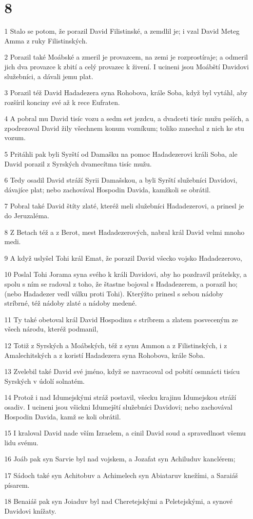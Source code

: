 \chapter{8}

\par 1 Stalo se potom, že porazil David Filistinské, a zemdlil je; i vzal David Meteg Amma z ruky Filistinských.
\par 2 Porazil také Moábské a zmeril je provazcem, na zemi je rozprostíraje; a odmeril jich dva provazce k zbití a celý provazec k živení. I ucineni jsou Moábští Davidovi služebníci, a dávali jemu plat.
\par 3 Porazil též David Hadadezera syna Rohobova, krále Soba, když byl vytáhl, aby rozšíril konciny své až k rece Eufraten.
\par 4 A pobral mu David tisíc vozu a sedm set jezdcu, a dvadceti tisíc mužu peších, a zpodrezoval David žily všechnem konum vozníkum; toliko zanechal z nich ke stu vozum.
\par 5 Pritáhli pak byli Syrští od Damašku na pomoc Hadadezerovi králi Soba, ale David porazil z Syrských dvamecítma tisíc mužu.
\par 6 Tedy osadil David stráží Syrii Damašskou, a byli Syrští služebníci Davidovi, dávajíce plat; nebo zachovával Hospodin Davida, kamžkoli se obrátil.
\par 7 Pobral také David štíty zlaté, kteréž meli služebníci Hadadezerovi, a prinesl je do Jeruzaléma.
\par 8 Z Betach též a z Berot, mest Hadadezerových, nabral král David velmi mnoho medi.
\par 9 A když uslyšel Tohi král Emat, že porazil David všecko vojsko Hadadezerovo,
\par 10 Poslal Tohi Jorama syna svého k králi Davidovi, aby ho pozdravil prátelsky, a spolu s ním se radoval z toho, že štastne bojoval s Hadadezerem, a porazil ho; (nebo Hadadezer vedl válku proti Tohi). Kterýžto prinesl s sebou nádoby stríbrné, též nádoby zlaté a nádoby medené.
\par 11 Ty také obetoval král David Hospodinu s stríbrem a zlatem posveceným ze všech národu, kteréž podmanil,
\par 12 Totiž z Syrských a Moábských, též z synu Ammon a z Filistinských, i z Amalechitských a z koristí Hadadezera syna Rohobova, krále Soba.
\par 13 Zvelebil také David své jméno, když se navracoval od pobití osmnácti tisícu Syrských v údolí solnatém.
\par 14 Protož i nad Idumejskými stráž postavil, všecku krajinu Idumejskou stráží osadiv. I ucineni jsou všickni Idumejští služebníci Davidovi; nebo zachovával Hospodin Davida, kamž se koli obrátil.
\par 15 I kraloval David nade vším Izraelem, a cinil David soud a spravedlnost všemu lidu svému.
\par 16 Joáb pak syn Sarvie byl nad vojskem, a Jozafat syn Achiluduv kanclérem;
\par 17 Sádoch také syn Achitobuv a Achimelech syn Abiataruv knežími, a Saraiáš písarem.
\par 18 Benaiáš pak syn Joiaduv byl nad Cheretejskými a Peletejskými, a synové Davidovi knížaty.

